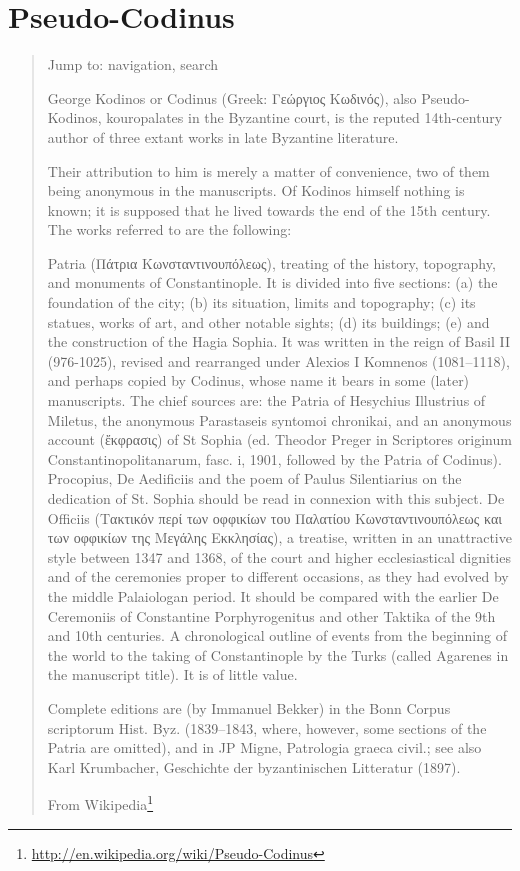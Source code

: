 \documentclass[12pt,letterpaper,twoside,final]{memoir}
\begin{document}
\section{Pseudo-Codinus}
\blockquote[From Wikipedia\footnote{\url{http://en.wikipedia.org/wiki/Pseudo-Codinus}}]{
Jump to: navigation, search

George Kodinos or Codinus (Greek: Γεώργιος Κωδινός), also Pseudo-Kodinos, kouropalates in the Byzantine court, is the reputed 14th-century author of three extant works in late Byzantine literature.

Their attribution to him is merely a matter of convenience, two of them being anonymous in the manuscripts. Οf Kodinos himself nothing is known; it is supposed that he lived towards the end of the 15th century. The works referred to are the following:

    Patria (Πάτρια Κωνσταντινουπόλεως), treating of the history, topography, and monuments of Constantinople. It is divided into five sections: (a) the foundation of the city; (b) its situation, limits and topography; (c) its statues, works of art, and other notable sights; (d) its buildings; (e) and the construction of the Hagia Sophia. It was written in the reign of Basil II (976-1025), revised and rearranged under Alexios I Komnenos (1081–1118), and perhaps copied by Codinus, whose name it bears in some (later) manuscripts. The chief sources are: the Patria of Hesychius Illustrius of Miletus, the anonymous Parastaseis syntomoi chronikai, and an anonymous account (ἔκφρασις) of St Sophia (ed. Theodor Preger in Scriptores originum Constantinopolitanarum, fasc. i, 1901, followed by the Patria of Codinus). Procopius, De Aedificiis and the poem of Paulus Silentiarius on the dedication of St. Sophia should be read in connexion with this subject.
    De Officiis (Τακτικόν περί των οφφικίων του Παλατίου Kωνσταντινουπόλεως και των οφφικίων της Μεγάλης Εκκλησίας), a treatise, written in an unattractive style between 1347 and 1368, of the court and higher ecclesiastical dignities and of the ceremonies proper to different occasions, as they had evolved by the middle Palaiologan period. It should be compared with the earlier De Ceremoniis of Constantine Porphyrogenitus and other Taktika of the 9th and 10th centuries.
    A chronological outline of events from the beginning of the world to the taking of Constantinople by the Turks (called Agarenes in the manuscript title). It is of little value.

Complete editions are (by Immanuel Bekker) in the Bonn Corpus scriptorum Hist. Byz. (1839–1843, where, however, some sections of the Patria are omitted), and in JP Migne, Patrologia graeca civil.; see also Karl Krumbacher, Geschichte der byzantinischen Litteratur (1897).}
\end{document}
